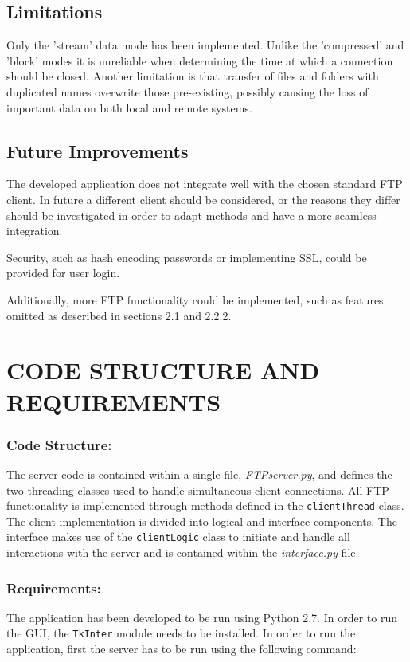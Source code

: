 \documentclass[10pt,twocolumn]{witseiepaper}
\begin{document}
\subsection{Limitations}
Only the 'stream' data mode has been implemented. Unlike the 'compressed' and 'block' modes it is unreliable when determining the time at which a connection should be closed. Another limitation is that transfer of files and folders with duplicated names overwrite those pre-existing, possibly causing the loss of important data on both local and remote systems.

\subsection{Future Improvements}
The developed application does not integrate well with the chosen standard FTP client. In future a different client should be considered, or the reasons they differ should be investigated in order to adapt methods and have a more seamless integration.

Security, such as hash encoding passwords or implementing SSL, could be provided for user login.

Additionally, more FTP functionality could be implemented, such as features omitted as described in sections 2.1 and 2.2.2.
\section{CODE STRUCTURE AND REQUIREMENTS}

\subsubsection*{Code Structure: } The server code is contained within a single file, \textit{FTPserver.py}, and defines the two threading classes used to handle simultaneous client connections. All FTP functionality is implemented through methods defined in the \texttt{clientThread} class. The client implementation is divided into logical and interface components. The interface makes use of the \texttt{clientLogic} class to initiate and handle all interactions with the server and is contained within the \textit{interface.py} file.  
 
\subsubsection*{Requirements: }
The application has been developed to be run using Python 2.7. In order to run the GUI, the \texttt{TkInter} module needs to be installed. In order to run the application, first the server has to be run using the following command:
\end{document}
